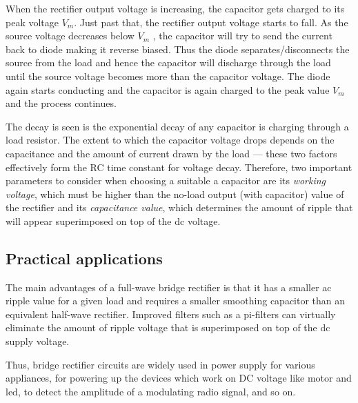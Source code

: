 When the rectifier output voltage is increasing, the capacitor gets charged to its peak voltage $V_m$. Just past that, the rectifier output voltage starts to fall. As the source voltage decreases below $V_m$ , the capacitor will try to send the current back to diode making it reverse biased. Thus the diode separates/disconnects the source from the load and hence the capacitor will discharge through the load until the source voltage becomes more than the capacitor voltage. The diode again starts conducting and the capacitor is again charged to the peak value $V_m$ and the process continues. 

The decay is seen is the exponential decay of any capacitor is charging through a load resistor. The extent to which the capacitor voltage drops depends on the capacitance and the amount of current drawn by the load --- these two factors effectively form the RC time constant for voltage decay. Therefore, two important parameters to consider when choosing a suitable a capacitor are its \textit{working voltage}, which must be higher than the no-load output (with capacitor) value of the rectifier and its \textit{capacitance value}, which determines the amount of ripple that will appear superimposed on top of the dc voltage. 

\subsection{Practical applications}
The main advantages of a full-wave bridge rectifier is that it has a smaller ac ripple value for a given load and requires a smaller smoothing capacitor than an equivalent half-wave rectifier. Improved filters such as a pi-filters can virtually eliminate the amount of ripple voltage that is superimposed on top of the dc supply voltage.

Thus, bridge rectifier circuits are widely used in power supply for various appliances, for powering up the devices which work on DC voltage like motor and led, to detect the amplitude of a modulating radio signal, and so on.